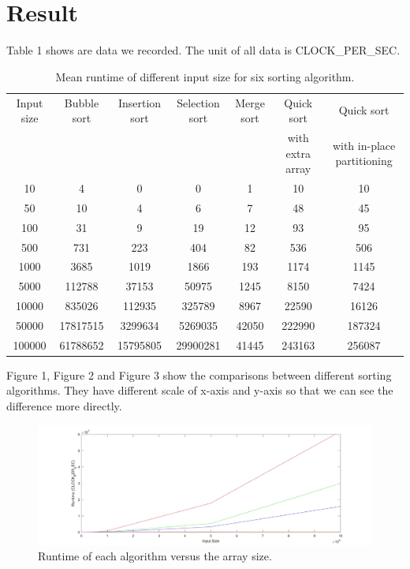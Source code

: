 \documentclass{article}
\begin{document}
\section{Result}
Table 1 shows are data we recorded. The unit of all data is CLOCK\_PER\_SEC.\\
\begin{table}[!hbp]
\centering
\begin{tabular}{|c||c|c|c|c|c|c|}
\hline
Input size & Bubble sort & Insertion sort & Selection sort & Merge sort & Quick sort  & Quick sort \\
 & & & & & with extra array & with in-place partitioning\\
\hline
10     & 4 & 0 & 0 & 1 & 10 & 10\\
50     & 10 & 4 & 6 & 7 & 48 & 45 \\
100    & 31 & 9 & 19 & 12 & 93 & 95 \\
500    & 731 & 223 & 404 & 82 & 536 & 506 \\
1000   & 3685 & 1019 & 1866 & 193 & 1174 & 1145 \\
5000   & 112788 & 37153 & 50975 & 1245 & 8150 & 7424 \\
10000  & 835026 & 112935 & 325789 & 8967 & 22590 & 16126 \\
50000  & 17817515 & 3299634 & 5269035 & 42050 & 222990 & 187324 \\
100000 & 61788652 & 15795805 & 29900281 & 41445 & 243163 & 256087 \\
\hline
\end{tabular}
\caption{Mean runtime of different input size for six sorting algorithm.}
\end{table}
Figure 1, Figure 2 and Figure 3 show the comparisons between different sorting algorithms. They have different scale of x-axis and y-axis so that we can see the difference more directly.\\
\begin{figure}[H]
\centering
\includegraphics[width=\textwidth]{1.jpg}
\caption{Runtime of each algorithm versus the array size.}
\end{figure}
\end{document}
